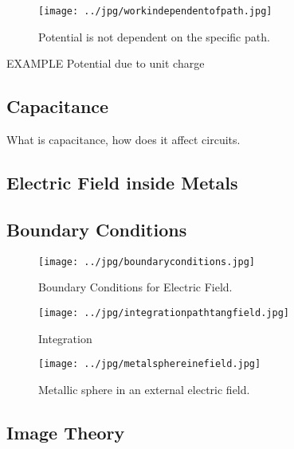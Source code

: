 \begin{figure}[htbp]
\begin{center}
\texttt{[image: ../jpg/workindependentofpath.jpg]}
\end{center}
\caption{Potential is not dependent on the specific path.}
\label{PotentialWork}
\end{figure}








{\large EXAMPLE} Potential due to unit charge





\subsection{Capacitance}
What is capacitance, how does it affect circuits.

\subsection{Electric Field inside Metals}


\subsection{Boundary Conditions}




\begin{figure}[htbp]
\begin{center}
\texttt{[image: ../jpg/boundaryconditions.jpg]}
\end{center}
\caption{Boundary Conditions for Electric Field.}
\label{BoundaryCondition}
\end{figure}





\begin{figure}[htbp]
\begin{center}
\texttt{[image: ../jpg/integrationpathtangfield.jpg]}
\end{center}
\caption{Integration}
\label{BoundaryCondition}
\end{figure}




\begin{figure}[htbp]
\begin{center}
\texttt{[image: ../jpg/metalsphereinefield.jpg]}
\end{center}
\caption{Metallic sphere in an external electric field.}
\label{BoundaryConditionMetal}
\end{figure}








\subsection{Image Theory}







 
